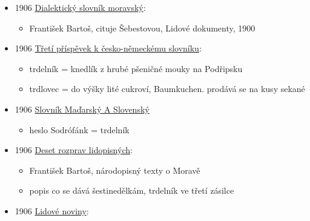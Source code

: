 \begin{itemize}
  \begin{itemize}
  \tightlist
  \item
    František Bartoš
  \item
    cituje zvyky nošení šestinedělce do kouta
  \end{itemize}
\item
  1906
  \href{https://ceskadigitalniknihovna.cz/view/uuid:d04052b0-a08e-11ed-bf61-5ef3fc9bb22f?page=uuid:50e42324-813b-4538-aaf5-2b1efbf63513&fulltext=trd*ln*k*&source=nkp}{Dialektický
  slovník moravský}:

  \begin{itemize}
  \tightlist
  \item
    František Bartoš, cituje Šebestovou, Lidové dokumenty, 1900
  \end{itemize}
\item
  1906
  \href{https://ndk.cz/uuid/uuid:6a5d3470-e943-11e2-9923-005056827e52}{Třetí
  příspěvek k česko-německému slovníku}:

  \begin{itemize}
  \tightlist
  \item
    trdelník = knedlík z hrubé pšeničné mouky na Podřipsku
  \item
    trdlovec = do výšky lité cukroví, Baumkuchen. prodává se na kusy
    sekané
  \end{itemize}
\item
  1906
  \href{https://dikda.snk.sk/uuid/uuid:a5d481cd-45e0-4830-8eb3-f6a70599c799}{Slovník
  Maďarský A Slovenský}

  \begin{itemize}
  \tightlist
  \item
    heslo Sodrófánk = trdelník
  \end{itemize}
\item
  1906
  \href{https://ceskadigitalniknihovna.cz/view/uuid:50b3ac32-1b3f-4639-9f61-c01f3883690d?page=uuid:ad4dfae7-7a29-11ed-b508-001b63bd97ba&fulltext=trdeln\%C3\%ADky&source=kfbz}{Deset
  rozprav lidopisných}:

  \begin{itemize}
  \tightlist
  \item
    František Bartoš, národopisný texty o Moravě
  \item
    popis co se dává šestinedělkám, trdelník ve třetí zásilce
  \end{itemize}
\item
  1906
  \href{https://www.digitalniknihovna.cz/vkol/uuid/uuid:b7691773-435d-11dd-b505-00145e5790ea}{Lidové
  noviny}:


\end{itemize}
